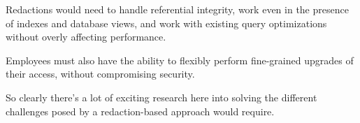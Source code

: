 Redactions would need to handle referential integrity, work even in the presence of indexes and database views, and work with existing query optimizations without overly affecting performance.

Employees must also have the ability to flexibly perform fine-grained upgrades of their access, without compromising security.

So clearly there’s a lot of exciting research here into solving the different challenges posed by a redaction-based approach would require.


